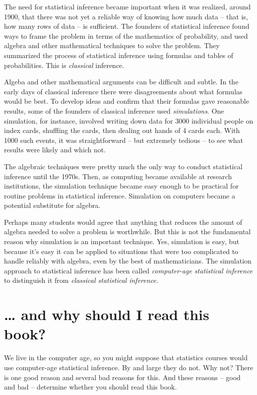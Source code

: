 \documentclass[]{tufte-book}
\begin{document}
The need for statistical inference became important when it was realized, around 1900, that there was not yet a reliable way of knowing how much data -- that is, how many rows of data -- is sufficient. The founders of statistical inference found ways to frame the problem in terms of the mathematics of probability, and used algebra and other mathematical techniques to solve the problem. They summarized the process of statistical inference using formulas and tables of probabilities. This is \emph{classical} inference.

Algeba and other mathematical arguments can be difficult and subtle. In the early days of classical inference there were disagreements about what formulas would be best. To develop ideas and confirm that their formulas gave reasonable results, some of the founders of classical inference used \emph{simulations}. One simulation, for instance, involved writing down data for 3000 individual people on index cards, shuffling the cards, then dealing out hands of 4 cards each. With 1000 such events, it was straightforward -- but extremely tedious -- to see what results were likely and which not.

The algebraic techniques were pretty much the only way to conduct statistical inference until the 1970s. Then, as computing became available at research institutions, the simulation technique became easy enough to be practical for routine problems in statistical inference. Simulation on computers became a potential substitute for algebra.

Perhaps many students would agree that anything that reduces the amount of algebra needed to solve a problem is worthwhile. But this is not the fundamental reason why simulation is an important technique. Yes, simulation is easy, but because it's easy it can be applied to situations that were too complicated to handle reliably with algebra, even by the best of mathematicians. The simulation approach to statistical inference has been called \emph{computer-age statistical inference} to distinguish it from \emph{classical statistical inference}.

\hypertarget{and-why-should-i-read-this-book}{%
\section*{\ldots{} and why should I read this book?}\label{and-why-should-i-read-this-book}}

We live in the computer age, so you might suppose that statistics courses would use computer-age statistical inference. By and large they do not. Why not? There is one good reason and several bad reasons for this. And these reasons -- good and bad -- determine whether you should read this book.
\end{document}
